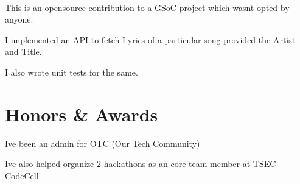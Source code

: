 \documentclass[]{deedy-resume-openfont}
\begin{document}
        
            \hfill {}\\
            \begin{tightemize}
  \item This is an opensource contribution to a GSoC project which wasn\textquotesingle{}t opted by anyone.
  \item I implemented an API to fetch Lyrics of a particular song provided the Artist and Title.
  \item I also wrote unit tests for the same.
\end{tightemize}
            \sectionsep

%
%
\section{Honors \& Awards}
\begin{tightemize}
\item I\textquotesingle{}ve been an admin for OTC (Our Tech Community)\\
\item I\textquotesingle{}ve also helped organize 2 hackathons as an core team member at TSEC CodeCell\\
\end{tightemize}
      \ 
      
\end{document}
